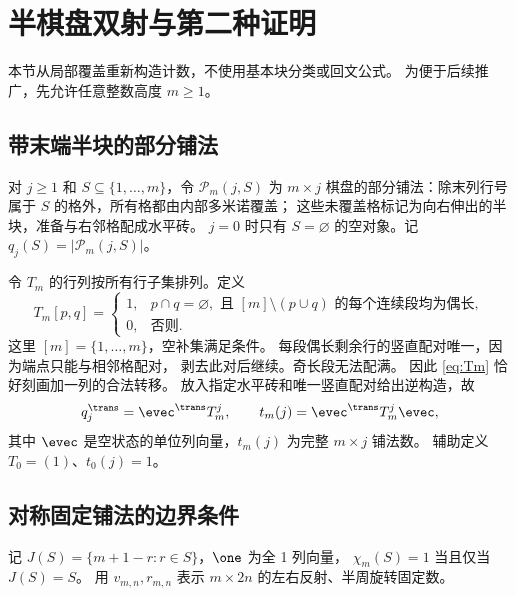 \section{半棋盘双射与第二种证明}\label{sec:half}
本节从局部覆盖重新构造计数，不使用基本块分类或回文公式。
为便于后续推广，先允许任意整数高度 $m\ge1$。

\subsection{带末端半块的部分铺法}
对 $j\ge1$ 和 $S\subseteq\{1,\ldots,m\}$，令 $\mathcal P_m(j,S)$ 为
$m\times j$ 棋盘的部分铺法：除末列行号属于 $S$ 的格外，所有格都由内部多米诺覆盖；
这些未覆盖格标记为向右伸出的半块，准备与右邻格配成水平砖。
$j=0$ 时只有 $S=\varnothing$ 的空对象。记 $q_j(S)=|\mathcal P_m(j,S)|$。

令 $T_m$ 的行列按所有行子集排列。定义
\begin{equation}\label{eq:Tm}
 T_m[p,q]=
 \begin{cases}
 1,&p\cap q=\varnothing,\text{ 且 }[m]\setminus(p\cup q)
       \text{ 的每个连续段均为偶长},\\
 0,&\text{否则}.
 \end{cases}
\end{equation}
这里 $[m]=\{1,\ldots,m\}$，空补集满足条件。
每段偶长剩余行的竖直配对唯一，因为端点只能与相邻格配对，
剥去此对后继续。奇长段无法配满。
因此 \eqref{eq:Tm} 恰好刻画加一列的合法转移。
放入指定水平砖和唯一竖直配对给出逆构造，故
\begin{equation}\label{eq:profile}
 q_j^{\trans}=\evec^{\trans}T_m^j,\qquad
 t_m(j)=\evec^{\trans}T_m^j\evec,
\end{equation}
其中 $\evec$ 是空状态的单位列向量，$t_m(j)$ 为完整 $m\times j$ 铺法数。
辅助定义 $T_0=(1)$、$t_0(j)=1$。

\subsection{对称固定铺法的边界条件}
记 $J(S)=\{m+1-r:r\in S\}$，$\one$ 为全 1 列向量，
$\chi_m(S)=1$ 当且仅当 $J(S)=S$。
用 $v_{m,n},r_{m,n}$ 表示 $m\times2n$ 的左右反射、半周旋转固定数。

